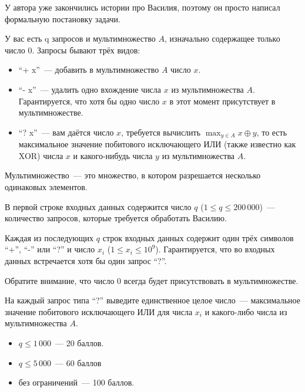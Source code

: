 
\Legend
У автора уже закончились истории про Василия, поэтому он просто написал формальную постановку задачи.

У вас есть q запросов и мультимножество $A$, изначально содержащее только число $0$. Запросы бывают трёх видов:
\begin{itemize}
	\item ``+ x''~--- добавить в мультимножество $A$ число $x$.
	\item ``- x''~--- удалить одно вхождение числа $x$ из мультимножества $A$. Гарантируется, что хотя бы одно число $x$ в этот момент присутствует в мультимножестве.
	\item ``? x''~--- вам даётся число $x$, требуется вычислить $\max_{y \in A}{x \oplus y}$, то есть максимальное значение побитового исключающего ИЛИ (также известно как XOR) числа $x$ и какого-нибудь числа $y$ из мультимножества $A$.
\end{itemize}

Мультимножество~--- это множество, в котором разрешается несколько одинаковых элементов.

\Input
В первой строке входных данных содержится число $q$ ($1 \le q \le 200\,000$)~--- количество запросов, которые требуется обработать Василию.

Каждая из последующих $q$ строк входных данных содержит один трёх символов ``+'', ``-'' или ``?'' и число $x_i$ ($1 \le x_i \le 10^9$).
Гарантируется, что во входных данных встречается хотя бы один запрос ``?''.

Обратите внимание, что число $0$ всегда будет присутствовать в мультимножестве.

\Output
На каждый запрос типа ``?'' выведите единственное целое число~--- максимальное значение побитового исключающего ИЛИ для числа $x_i$ и какого-либо числа из мультимножества $A$.

\Samples
\BeginTests
{}
\EndTests

\Scoring
\begin{itemize}
	\item $q \le 1\,000$~--- 20 баллов.
	\item $q \le 5\,000$~--- 60 баллов
	\item без ограничений~--- 100 баллов.
\end{itemize}

\EndProblem
